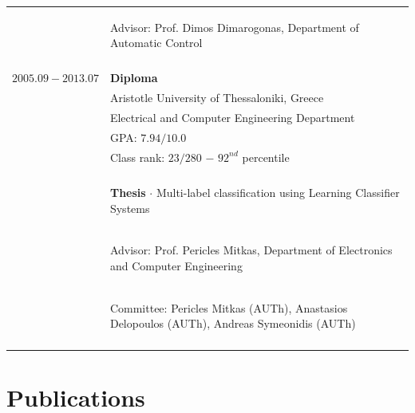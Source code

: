 \documentclass[a4paper,10pt,twoside]{article}
\begin{document}
\begin{tabular}{rp{11cm}}
                     & \begin{small}Advisor: Prof. Dimos Dimarogonas, Department of Automatic Control\end{small} \\
&\\
$2005.09 - 2013.07$  & \textbf{Diploma} \\
                     & Aristotle University of Thessaloniki, Greece \\
                     & Electrical and Computer Engineering Department \\
                     & GPA: $7.94 / 10.0$ \\
                     & Class rank: $23 / 280$ $-$ $92^{nd}$ percentile \\
                     &\\
                     & \begin{small}\textbf{Thesis} $\cdot$ Multi-label classification using Learning Classifier Systems \end{small}\\
                     & \begin{small}Advisor: Prof. Pericles Mitkas, Department of Electronics and Computer Engineering\end{small}\\
                     & \begin{small}Committee: Pericles Mitkas (AUTh), Anastasios Delopoulos (AUTh), Andreas Symeonidis (AUTh) \end{small}\\
&\\
\end{tabular}

\vspace*{\fill}
\newpage

\section{Publications}
\end{document}
